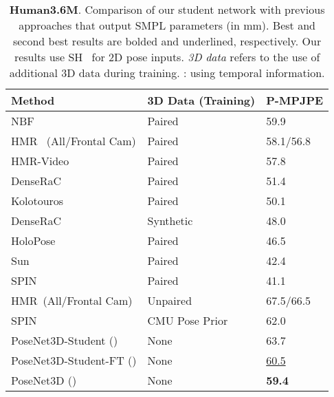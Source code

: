 \documentclass[10pt,twocolumn,letterpaper]{article}
\begin{document}
\begin{table}[tb!]
	\centering
	\small
	\begin{adjustbox}{max width=0.95\linewidth}
		\begin{tabular}{lll}
			\toprule
			Method & 3D Data (Training) &  P-MPJPE \\
			
			\midrule
			NBF~\cite{omran2018neural}  & Paired &   59.9  \\
			HMR~\cite{kanazawa2018end} (All/Frontal Cam)  & Paired &   58.1/56.8  \\
			HMR-Video~\cite{kanazawa2019learning}  & Paired &   57.8  \\		 
			DenseRaC~\cite{xu2019denserac}  & Paired &   51.4  \\	
			Kolotouros~\etal~\cite{kolotouros2019convolutional}  & Paired &   50.1 \\		 	
			DenseRaC~\cite{xu2019denserac}  & Synthetic  &   48.0  \\ 
			HoloPose~\cite{guler2019holopose}  & Paired &  46.5  \\
			Sun~\etal~\cite{SunHMRICCV19}  & Paired &  42.4  \\
			
			SPIN~\cite{SPIN_ICCV2019} & Paired  &   41.1\\
			\midrule
			HMR~\cite{kanazawa2018end}(All/Frontal Cam) & Unpaired &   67.5/66.5  \\
			SPIN~\cite{SPIN_ICCV2019} & CMU Pose Prior  &   {62.0} \\
			
			
			\midrule
			PoseNet3D-Student ()  & None &  63.7 \\
			PoseNet3D-Student-FT () & None &  \underline{60.5}  \\
			PoseNet3D () & None &  \textbf{59.4} \\		 \bottomrule
		\end{tabular}
	\end{adjustbox}
	\vspace{-1ex}
	\caption{\textbf{Human3.6M}. Comparison of our student network with previous approaches that output SMPL parameters (in mm). Best and second best results are bolded and underlined, respectively. Our results use SH~\cite{stacked-hourglass} for 2D pose inputs. \textit{3D data} refers to the use of additional 3D data during training. : using temporal information.}
	\label{table:h36_student}
	\vspace{-2ex}
\end{table}
\end{document}
